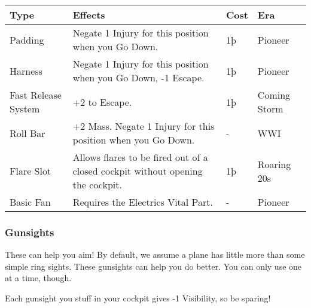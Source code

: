\documentclass{article}
\begin{document}
\begin{tabular}{|l|l|l|l|}
  \hline
  Type                 & Effects                                                        & Cost        & Era          \\\hline
  Padding              & Negate 1 Injury for this position when you Go Down.            & 1þ          &
  Pioneer                                                                                                            \\\hline
  Harness              & Negate 1 Injury for this position when you Go Down, -1 Escape.
                       & 1þ                                                             & Pioneer                    \\\hline
  Fast Release System  & +2 to Escape.                                                  & 1þ          & Coming Storm \\\hline
  Roll Bar             & +2 Mass. Negate 1 Injury for this position when you Go Down.
                       & -                                                              & WWI                        \\\hline
  Flare Slot           & Allows flares to be fired out of a closed cockpit without
  opening the cockpit. & 1þ                                                             & Roaring 20s                \\\hline
  Basic Fan            & Requires the Electrics Vital Part.                             & -           & Pioneer      \\\hline
\end{tabular}

\subsubsection{Gunsights}
\label{_Gunsights}

These can help you aim! By default, we assume a plane has little more
than some simple ring sights. These gunsights can help you do better.
You can only use one at a time, though.

Each gunsight you stuff in your cockpit gives -1 Visibility, so
be sparing!
\end{document}
